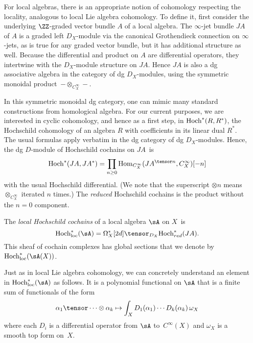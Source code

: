 For local algebras, there is an appropriate notion of cohomology respecting the locality, 
analogous to local Lie algebra cohomology. 
To define it, first consider the underlying $\ZZ$-graded vector bundle $A$ of a local algebra. 
The $\infty$-jet bundle $JA$ of $A$ is a graded left $D_X$-module via the canonical Grothendieck connection on $\infty$-jets,
as is true for any graded vector bundle,
but it has additional structure as well.
Because the differential and product on $A$ are differential operators, 
they intertwine with the $D_X$-module structure on $JA$.
Hence $JA$ is also a dg associative algebra in the category of dg $D_X$-modules,
using the symmetric monoidal product~$- \otimes_{C^\infty_X} -$. 


In this symmetric monoidal dg category, 
one can mimic many standard constructions from homological algebra.
For our current purposes, we are interested in cyclic cohomology,
and hence as a first step, in $\Hoch^*(R,R^*)$, the Hochschild cohomology of an algebra $R$ with coefficients in its linear dual $R^*$.
The usual formulas apply verbatim in the dg category of dg $D_X$-modules.
Hence, the dg $D$-module of Hochschild cochains on $JA$~is 
\[
\Hoch^* (JA, JA^*) = \prod_{n \geq 0} {\rm Hom}_{C^\infty_X} (JA^{\tensor n}, C^\infty_X)[-n]
\]
with the usual Hochschild differential.
(We note that the superscript $\otimes n$ means $\otimes_{C^\infty_X}$ iterated $n$ times.)
The {\em reduced} Hochschild cochains is the product without the $n=0$ component. 

\def\Hoch{{\rm Hoch}}
\def\Hochloc{{\rm Hoch}_{\rm loc}}
\def\Cyc{{\rm Cyc}}
\def\Cycloc{{\rm Cyc}_{\rm loc}}


\begin{dfn}\label{dfn: hochloc}
The {\em local Hochschild cochains} of a local algebra $\sA$ on $X$~is 
\[
\Hochloc^*(\sA) = \Omega^*_X[2d] \tensor_{D_X} \Hoch^*_{red} (JA) .
\] 
This sheaf of cochain complexes has global sections that we denote by~$\Hochloc^*(\sA(X))$.
\end{dfn}

Just as in local Lie algebra cohomology, we can concretely understand an element in $\Hochloc^*(\sA)$ as follows.
It is a polynomial functional  on $\sA$ that is a finite sum of functionals of the form
\[
\alpha_1 \tensor \cdots \otimes \alpha_k \mapsto \int_X  D_1(\alpha_1) \cdots D_k(\alpha_k) \, \omega_X
\]
where each $D_i$ is a differential operator from $\sA$ to~$C^\infty(X)$ and $\omega_X$ is a smooth top form on~$X$. 

